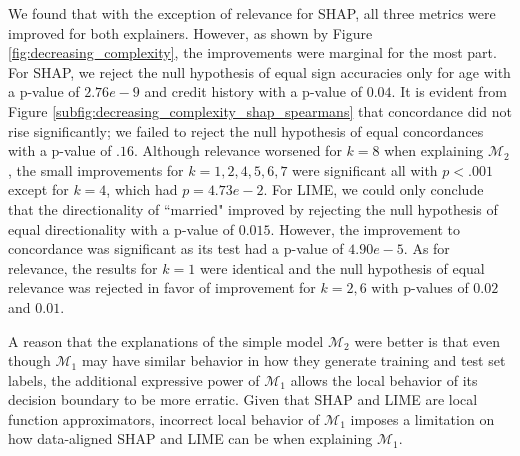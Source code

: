 \documentclass[mnsc,blindrev]{informs3}
\begin{document}
            We found that with the exception of relevance for SHAP, all three metrics were improved for both explainers. However, as shown by Figure \ref{fig:decreasing_complexity}, the improvements were marginal for the most part. For SHAP, we reject the null hypothesis of equal sign accuracies only for age with a p-value of $2.76e-9$ and credit history with a p-value of $0.04$. It is evident from Figure \ref{subfig:decreasing_complexity_shap_spearmans} that concordance did not rise significantly; we failed to reject the null hypothesis of equal concordances with a p-value of $.16$. Although relevance worsened for $k=8$ when explaining $\mathcal{M}_2$, the small improvements for $k=1,2,4,5,6,7$ were significant all with $p<.001$ except for $k=4$, which had $p=4.73e-2$.%
            For LIME, we could only conclude that the directionality of ``married" improved by rejecting the null hypothesis of equal directionality with a p-value of $0.015$. However, the improvement to concordance was significant as its test had a p-value of $4.90e-5$. As for relevance, the results for $k=1$ were identical and the null hypothesis of equal relevance was rejected in favor of improvement for $k=2,6$ with p-values of $0.02$ and $0.01$. 
            
            A reason that the explanations of the simple model $\mathcal{M}_2$ were better is that even though $\mathcal{M}_1$ may have similar behavior in how they generate training and test set labels, the additional expressive power of $\mathcal{M}_1$ allows the local behavior of its decision boundary to be more erratic. Given that SHAP and LIME are local function approximators, incorrect local behavior of $\mathcal{M}_1$ imposes a limitation on how data-aligned SHAP and LIME can be when explaining $\mathcal{M}_1$. 
\end{document}
